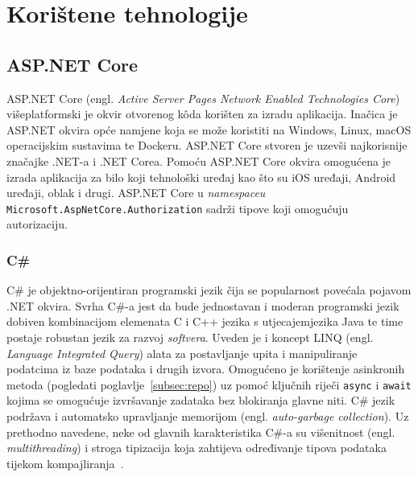 \section{Korištene tehnologije}

\subsection{ASP.NET Core}

ASP.NET Core (engl. \textit{Active Server Pages Network Enabled Technologies Core}) višeplatformski je okvir otvorenog k\^oda korišten za izradu aplikacija. Inačica je ASP.NET okvira opće namjene koja se može koristiti na Windows, Linux, macOS operacijskim sustavima te Dockeru. ASP.NET Core stvoren je uzevši najkorisnije značajke .NET-a i .NET Corea. Pomoću ASP.NET Core okvira omogućena je izrada aplikacija za bilo koji tehnološki uređaj kao što su iOS uređaji, Android uređaji, oblak i drugi. ASP.NET Core u \textit{namespaceu} \texttt{Microsoft.AspNetCore.Authorization} sadrži tipove koji omogućuju autorizaciju\cite{aspNetCore}.


\subsubsection{C\#}
C\# je objektno-orijentiran programski jezik čija se popularnost povećala pojavom .NET okvira. Svrha C\#-a jest da bude jednostavan i moderan programski jezik dobiven kombinacijom elemenata C i C++ jezika s utjecajemjezika Java te time postaje robustan jezik za razvoj \textit{softvera}. Uveden je i koncept LINQ (engl. \textit{Language Integrated Query}) alata za postavljanje upita i manipuliranje podatcima iz baze podataka i drugih izvora. Omogućeno je korištenje asinkronih metoda (pogledati poglavlje~\ref{subsec:repo}) uz pomoć ključnih riječi \texttt{async} i \texttt{await} kojima se omogućuje izvršavanje zadataka bez blokiranja glavne niti. C\# jezik podržava i automatsko upravljanje memorijom (engl. \textit{auto-garbage collection}). Uz prethodno navedene, neke od glavnih karakteristika C\#-a su višenitnost (engl. \textit{multithreading}) i stroga tipizacija koja zahtijeva određivanje tipova podataka tijekom kompajliranja~\cite{cSharp}.

